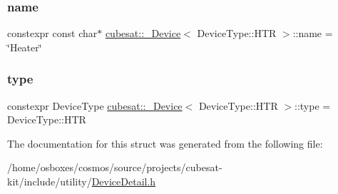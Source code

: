 \subsubsection{\texorpdfstring{name}{name}}
{\footnotesize\ttfamily constexpr const char$\ast$ \hyperlink{structcubesat_1_1__Device}{cubesat\+::\+\_\+\+Device}$<$ Device\+Type\+::\+H\+TR $>$\+::name = \char`\"{}Heater\char`\"{}\hspace{0.3cm}{\ttfamily [static]}}

\mbox{\label{structcubesat_1_1__Device_3_01DeviceType_1_1HTR_01_4_a229515b71efb58bc4a80d1dc2094eb64}} 
\subsubsection{\texorpdfstring{type}{type}}
{\footnotesize\ttfamily constexpr Device\+Type \hyperlink{structcubesat_1_1__Device}{cubesat\+::\+\_\+\+Device}$<$ Device\+Type\+::\+H\+TR $>$\+::type = Device\+Type\+::\+H\+TR\hspace{0.3cm}{\ttfamily [static]}}



The documentation for this struct was generated from the following file\+:\begin{DoxyCompactItemize}
\item 
/home/osboxes/cosmos/source/projects/cubesat-\/kit/include/utility/\hyperlink{DeviceDetail_8h}{Device\+Detail.\+h}\end{DoxyCompactItemize}
